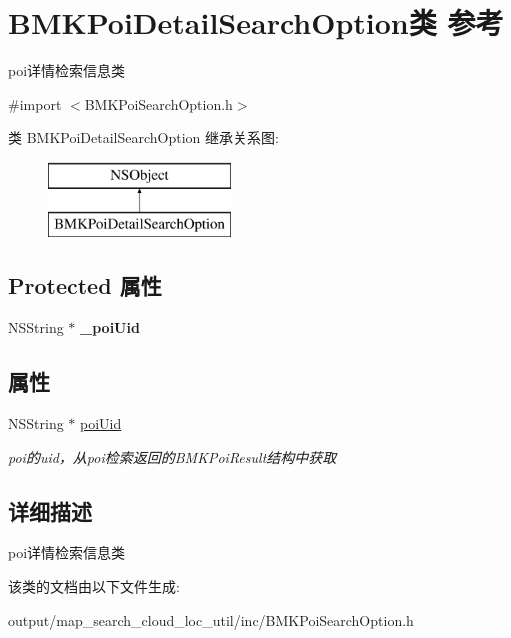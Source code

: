 \hypertarget{interface_b_m_k_poi_detail_search_option}{\section{B\+M\+K\+Poi\+Detail\+Search\+Option类 参考}
\label{interface_b_m_k_poi_detail_search_option}
}


poi详情检索信息类  




{\ttfamily \#import $<$B\+M\+K\+Poi\+Search\+Option.\+h$>$}

类 B\+M\+K\+Poi\+Detail\+Search\+Option 继承关系图\+:\begin{figure}[H]
\begin{center}
\leavevmode
\includegraphics[height=2.000000cm]{interface_b_m_k_poi_detail_search_option}
\end{center}
\end{figure}
\subsection*{Protected 属性}
\begin{DoxyCompactItemize}
\item 
\hypertarget{interface_b_m_k_poi_detail_search_option_a9cbce2578220c6a05536df2200013659}{N\+S\+String $\ast$ {\bfseries \+\_\+poi\+Uid}}\label{interface_b_m_k_poi_detail_search_option_a9cbce2578220c6a05536df2200013659}

\end{DoxyCompactItemize}
\subsection*{属性}
\begin{DoxyCompactItemize}
\item 
\hypertarget{interface_b_m_k_poi_detail_search_option_a270c8018741875dc0bd80018b077952d}{N\+S\+String $\ast$ \hyperlink{interface_b_m_k_poi_detail_search_option_a270c8018741875dc0bd80018b077952d}{poi\+Uid}}\label{interface_b_m_k_poi_detail_search_option_a270c8018741875dc0bd80018b077952d}

\begin{DoxyCompactList}\small\item\em poi的uid，从poi检索返回的\+B\+M\+K\+Poi\+Result结构中获取 \end{DoxyCompactList}\end{DoxyCompactItemize}


\subsection{详细描述}
poi详情检索信息类 

该类的文档由以下文件生成\+:\begin{DoxyCompactItemize}
\item 
output/map\+\_\+search\+\_\+cloud\+\_\+loc\+\_\+util/inc/B\+M\+K\+Poi\+Search\+Option.\+h\end{DoxyCompactItemize}
